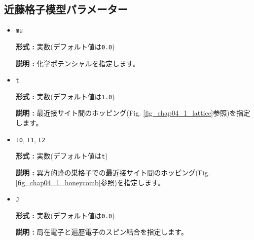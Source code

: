 \subsection{近藤格子模型パラメーター}
\begin{itemize}
\item \verb|mu|

{\bf 形式 :} 実数(デフォルト値は\verb|0.0|)

{\bf 説明 :} 化学ポテンシャルを指定します。

\item \verb|t|

{\bf 形式 :} 実数(デフォルト値は\verb|1.0|)

{\bf 説明 :} 最近接サイト間のホッピング(Fig. \ref{fig_chap04_1_lattice}参照)を指定します。

\item \verb|t0|, \verb|t1|, \verb|t2|

{\bf 形式 :} 実数(デフォルト値は\verb|t|)

{\bf 説明 :} 異方的蜂の巣格子での最近接サイト間のホッピング(Fig. \ref{fig_chap04_1_honeycomb}参照)を指定します。

\item \verb|J|

{\bf 形式 :} 実数(デフォルト値は\verb|0.0|)

{\bf 説明 :} 局在電子と遍歴電子のスピン結合を指定します。
\end{itemize}


